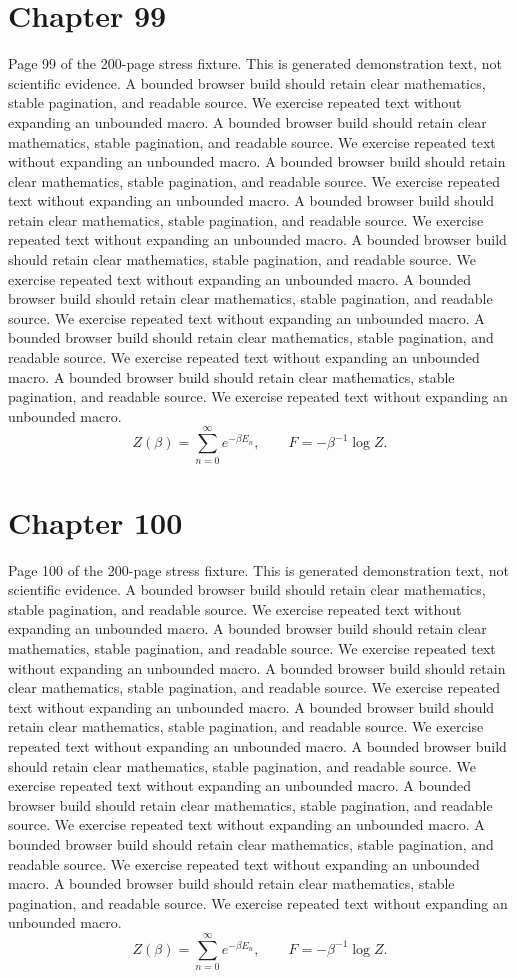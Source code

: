 \documentclass[11pt]{article}
\begin{document}
\section*{Chapter 99}
Page 99 of the 200-page stress fixture. This is generated demonstration text, not scientific evidence.
A bounded browser build should retain clear mathematics, stable pagination, and readable source. We exercise repeated text without expanding an unbounded macro.
A bounded browser build should retain clear mathematics, stable pagination, and readable source. We exercise repeated text without expanding an unbounded macro.
A bounded browser build should retain clear mathematics, stable pagination, and readable source. We exercise repeated text without expanding an unbounded macro.
A bounded browser build should retain clear mathematics, stable pagination, and readable source. We exercise repeated text without expanding an unbounded macro.
A bounded browser build should retain clear mathematics, stable pagination, and readable source. We exercise repeated text without expanding an unbounded macro.
A bounded browser build should retain clear mathematics, stable pagination, and readable source. We exercise repeated text without expanding an unbounded macro.
A bounded browser build should retain clear mathematics, stable pagination, and readable source. We exercise repeated text without expanding an unbounded macro.
A bounded browser build should retain clear mathematics, stable pagination, and readable source. We exercise repeated text without expanding an unbounded macro.
\[Z(\beta)=\sum_{n=0}^{\infty}e^{-\beta E_n},\qquad F=-\beta^{-1}\log Z.\]
\newpage
\section*{Chapter 100}
Page 100 of the 200-page stress fixture. This is generated demonstration text, not scientific evidence.
A bounded browser build should retain clear mathematics, stable pagination, and readable source. We exercise repeated text without expanding an unbounded macro.
A bounded browser build should retain clear mathematics, stable pagination, and readable source. We exercise repeated text without expanding an unbounded macro.
A bounded browser build should retain clear mathematics, stable pagination, and readable source. We exercise repeated text without expanding an unbounded macro.
A bounded browser build should retain clear mathematics, stable pagination, and readable source. We exercise repeated text without expanding an unbounded macro.
A bounded browser build should retain clear mathematics, stable pagination, and readable source. We exercise repeated text without expanding an unbounded macro.
A bounded browser build should retain clear mathematics, stable pagination, and readable source. We exercise repeated text without expanding an unbounded macro.
A bounded browser build should retain clear mathematics, stable pagination, and readable source. We exercise repeated text without expanding an unbounded macro.
A bounded browser build should retain clear mathematics, stable pagination, and readable source. We exercise repeated text without expanding an unbounded macro.
\[Z(\beta)=\sum_{n=0}^{\infty}e^{-\beta E_n},\qquad F=-\beta^{-1}\log Z.\]
\newpage
\end{document}
